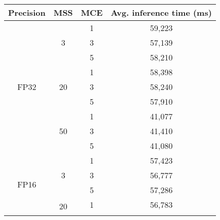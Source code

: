 \begin{table}[]
	\begin{tabular}{cccc}
		\hline
		\multicolumn{1}{|c|}{\textbf{Precision}}    & \multicolumn{1}{c|}{\textbf{MSS}}        & \multicolumn{1}{c|}{\textbf{MCE}} & \multicolumn{1}{c|}{\textbf{Avg. inference time (ms)}} \\ \hline
		\multicolumn{1}{|c|}{\multirow{9}{*}{FP32}} & \multicolumn{1}{c|}{\multirow{3}{*}{3}}  & \multicolumn{1}{c|}{1}  & \multicolumn{1}{c|}{59,223}    \\ \cline{3-4} 
		\multicolumn{1}{|c|}{}   & \multicolumn{1}{c|}{}          & \multicolumn{1}{c|}{3}  & \multicolumn{1}{c|}{57,139}    \\ \cline{3-4} 
		\multicolumn{1}{|c|}{}   & \multicolumn{1}{c|}{}          & \multicolumn{1}{c|}{5}  & \multicolumn{1}{c|}{58,210}    \\ \cline{2-4} 
		\multicolumn{1}{|c|}{}   & \multicolumn{1}{c|}{\multirow{3}{*}{20}} & \multicolumn{1}{c|}{1}  & \multicolumn{1}{c|}{58,398}    \\ \cline{3-4} 
		\multicolumn{1}{|c|}{}   & \multicolumn{1}{c|}{}          & \multicolumn{1}{c|}{3}  & \multicolumn{1}{c|}{58,240}    \\ \cline{3-4} 
		\multicolumn{1}{|c|}{}   & \multicolumn{1}{c|}{}          & \multicolumn{1}{c|}{5}  & \multicolumn{1}{c|}{57,910}    \\ \cline{2-4} 
		\multicolumn{1}{|c|}{}   & \multicolumn{1}{c|}{\multirow{3}{*}{50}} & \multicolumn{1}{c|}{1}  & \multicolumn{1}{c|}{41,077}    \\ \cline{3-4} 
		\multicolumn{1}{|c|}{}   & \multicolumn{1}{c|}{}          & \multicolumn{1}{c|}{3}  & \multicolumn{1}{c|}{41,410}    \\ \cline{3-4} 
		\multicolumn{1}{|c|}{}   & \multicolumn{1}{c|}{}          & \multicolumn{1}{c|}{5}  & \multicolumn{1}{c|}{41,080}    \\ \hline
		\multicolumn{1}{|c|}{\multirow{9}{*}{FP16}} & \multicolumn{1}{c|}{\multirow{3}{*}{3}}  & \multicolumn{1}{c|}{1}  & \multicolumn{1}{c|}{57,423}    \\ \cline{3-4} 
		\multicolumn{1}{|c|}{}   & \multicolumn{1}{c|}{}          & \multicolumn{1}{c|}{3}  & \multicolumn{1}{c|}{56,777}    \\ \cline{3-4} 
		\multicolumn{1}{|c|}{}   & \multicolumn{1}{c|}{}          & \multicolumn{1}{c|}{5}  & \multicolumn{1}{c|}{57,286}    \\ \cline{2-4} 
		\multicolumn{1}{|c|}{}   & \multicolumn{1}{c|}{\multirow{3}{*}{20}} & \multicolumn{1}{c|}{1}  & \multicolumn{1}{c|}{56,783}    \\ \cline{3-4} 

\end{tabular}
\end{table}
